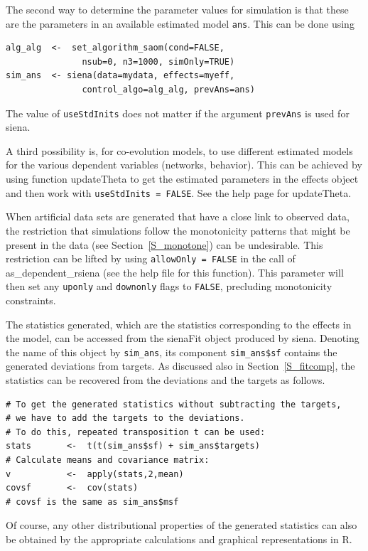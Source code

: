 \documentclass[a4paper,fleqn,11pt]{article}
\newcommand{\+}{\, + \,}
\newcommand{\sfn}[1]{\textsf{#1}}
\newcommand{\Rn}{{\sf R}}
\begin{document}
The second way to determine the parameter values for simulation
is that these are the parameters in an available estimated
model \texttt{ans}. This can be done using
\begin{verbatim}
alg_alg  <-  set_algorithm_saom(cond=FALSE,
               nsub=0, n3=1000, simOnly=TRUE)
sim_ans  <- siena(data=mydata, effects=myeff,
               control_algo=alg_alg, prevAns=ans)
\end{verbatim}
The value of \texttt{useStdInits} does not matter if the argument
\texttt{prevAns} is used for \sfn{siena}.

A third possibility is, for co-evolution models,
to use different estimated models for the various dependent
variables (networks, behavior). This can be achieved by using function
\sfn{updateTheta} to get the estimated parameters in the effects object
and then work with \texttt{useStdInits = FALSE}.
See the help page for \sfn{updateTheta}.
\medskip

When artificial data sets are generated that have a close link to observed data,
the restriction that simulations follow the monotonicity patterns that
might be present in the data (see Section~\ref{S_monotone}) can be undesirable.
This restriction can be lifted by using \texttt{allowOnly = FALSE}
in the call of \textsf{as\_dependent\_rsiena} (see the help file for this function).
This parameter will then set any \texttt{uponly} and \texttt{downonly}
flags to \texttt{FALSE}, precluding monotonicity constraints.
\medskip


The statistics generated, which are the statistics
corresponding to the effects in the model,
can be accessed from the \textsf{sienaFit}
object produced by \textsf{siena}.
Denoting the name of this object by \texttt{sim\_ans},
its component  \texttt{sim\_ans\$sf} contains the generated
deviations from targets. As discussed also in Section~\ref{S_fitcomp},
the statistics can be recovered from the deviations and the targets
as follows.
\begin{verbatim}
# To get the generated statistics without subtracting the targets,
# we have to add the targets to the deviations.
# To do this, repeated transposition t can be used:
stats       <-  t(t(sim_ans$sf) + sim_ans$targets)
# Calculate means and covariance matrix:
v           <-  apply(stats,2,mean)
covsf       <-  cov(stats)
# covsf is the same as sim_ans$msf
\end{verbatim}
Of course, any other distributional properties of the
generated statistics can also be obtained by the
appropriate calculations and graphical representations in \Rn.
\end{document}
